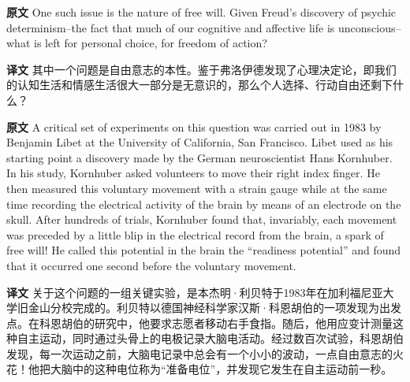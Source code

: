 \documentclass[UTF8]{ctexart}
\newenvironment{english}{\par\small\noindent\textbf{原文}\quad\ignorespaces}{\par}
\newenvironment{zhtranslation}{\par\noindent\textbf{译文}\quad\ignorespaces}{\par\vspace{0.35em}}
\begin{document}
\begin{english}
One such issue is the nature of free will. Given Freud's discovery of psychic determinism--the fact that much of our cognitive and affective life is unconscious--what is left for personal choice, for freedom of action?
\end{english}
\begin{zhtranslation}
其中一个问题是自由意志的本性。鉴于弗洛伊德发现了心理决定论，即我们的认知生活和情感生活很大一部分是无意识的，那么个人选择、行动自由还剩下什么？
\end{zhtranslation}

\begin{english}
A critical set of experiments on this question was carried out in 1983 by Benjamin Libet at the University of California, San Francisco. Libet used as his starting point a discovery made by the German neuroscientist Hans Kornhuber. In his study, Kornhuber asked volunteers to move their right index finger. He then measured this voluntary movement with a strain gauge while at the same time recording the electrical activity of the brain by means of an electrode on the skull. After hundreds of trials, Kornhuber found that, invariably, each movement was preceded by a little blip in the electrical record from the brain, a spark of free will! He called this potential in the brain the “readiness potential” and found that it occurred one second before the voluntary movement.
\end{english}
\begin{zhtranslation}
关于这个问题的一组关键实验，是本杰明·利贝特于1983年在加利福尼亚大学旧金山分校完成的。利贝特以德国神经科学家汉斯·科恩胡伯的一项发现为出发点。在科恩胡伯的研究中，他要求志愿者移动右手食指。随后，他用应变计测量这种自主运动，同时通过头骨上的电极记录大脑电活动。经过数百次试验，科恩胡伯发现，每一次运动之前，大脑电记录中总会有一个小小的波动，一点自由意志的火花！他把大脑中的这种电位称为“准备电位”，并发现它发生在自主运动前一秒。\end{zhtranslation}
\end{document}
